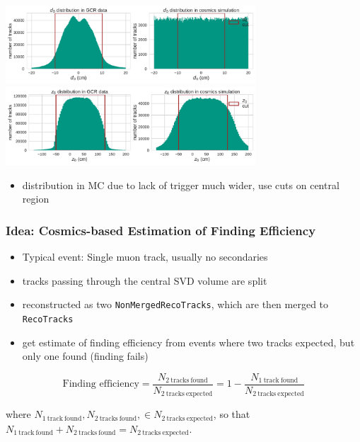 \documentclass[18pt]{beamer}
\begin{document}
  \begin{frame}
    \begin{center}
      \includegraphics[width=0.7\textwidth]{figures/distributions/gcr_d0_distribution_uncut.pdf}\\
      \includegraphics[width=0.7\textwidth]{figures/distributions/gcr_z0_distribution_uncut.pdf}
    \end{center}
    \begin{itemize}
    \item distribution in MC due to lack of trigger much wider, use cuts on central region
    \end{itemize}
  \end{frame}

  \begin{frame}
    \frametitle{Idea: Cosmics-based Estimation of Finding Efficiency}
    \begin{itemize}
    \item Typical event: Single muon track, usually no secondaries
    \item tracks passing through the central SVD volume are split
    \item reconstructed as two \texttt{NonMergedRecoTracks},
      which are then merged to \texttt{RecoTracks}
    \item get estimate of finding efficiency from events where two tracks expected, but only one found (finding fails)
    \end{itemize}
    \pause
    \begin{block}{}
      \begin{equation*}
        \label{eq:cosmic_eff}
        \text{Finding efficiency} = \frac{N_\mathrm{2\ tracks\ found}}{N_\mathrm{2\ tracks\ expected}}
        = 1 - \frac{N_\mathrm{1\ track\ found}}{N_\mathrm{2\ tracks\ expected}}
      \end{equation*}             %
    \end{block}
    where $N_\mathrm{1\ track\ found}, N_\mathrm{2\ tracks\ found}, \in N_\mathrm{2\ tracks\ expected}$, so that $N_\mathrm{1\ track\ found} + N_\mathrm{2\ tracks\ found} = N_\mathrm{2\ tracks\ expected}$.
    \centering
  \end{frame}
\end{document}

